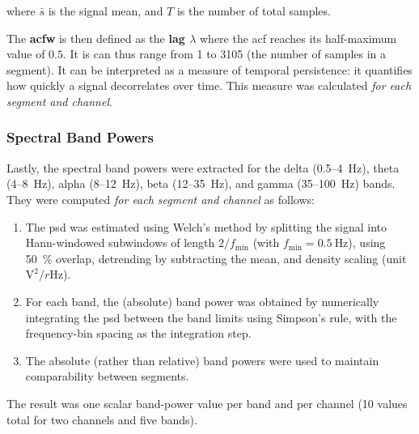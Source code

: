 where $\bar{s}$ is the signal mean, and $T$ is the number of total samples.

The \textbf{\gls{acfw}} is then defined as the \textbf{lag $\lambda$} where the \gls{acf} reaches its half-maximum value of $0.5$.
It is can thus range from 1 to 3105 (the number of samples in a segment).
It can be interpreted as a measure of temporal persistence: it quantifies how quickly a signal decorrelates over time.
This measure was calculated \textit{for each segment and channel}.

\subsubsection{Spectral Band Powers}
Lastly, the spectral band powers were extracted for the delta (0.5–\SI{4}{\Hz}), theta (4–\SI{8}{\Hz}), alpha (8–\SI{12}{\Hz}), beta (12–\SI{35}{\Hz}), and gamma (35–\SI{100}{\Hz}) bands.
They were computed \textit{for each segment and channel} as follows:

\begin{enumerate}
    \item The \gls{psd} was estimated using Welch’s method by splitting the signal into Hann-windowed subwindows of length $2/f_{\min}$ (with $f_{\min}=\SI{0.5}{\Hz}$), using \SI{50}{\percent} overlap, detrending by subtracting the mean, and density scaling (unit $\si{\volt}^2 / r\si{\Hz}$).
    \item For each band, the (absolute) band power was obtained by numerically integrating the \gls{psd} between the band limits using Simpson’s rule, with the frequency-bin spacing as the integration step.
    \item The absolute (rather than relative) band powers were used to maintain comparability between segments.
\end{enumerate}

The result was one scalar band-power value per band and per channel (10 values total for two channels and five bands).
